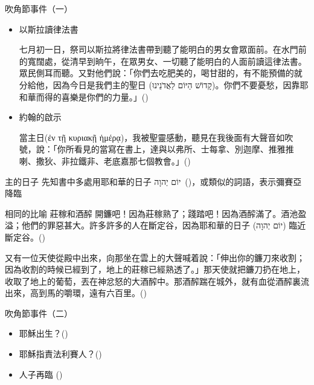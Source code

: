\documentclass{beamer}
\newcommand{\parvspace}{\par\vspace{0.5em}}
\begin{document}
\begin{frame}{吹角節事件（一）}
  \begin{itemize}
    \item 以斯拉讀律法書\par
      \alert{七月初一日}，祭司以斯拉將律法書帶到聽了能明白的男女會眾面前。在水門前的寬闊處，從清早到晌午，在眾男女、一切聽了能明白的人面前讀這律法書。眾民側耳而聽。\textellipsis{}又對他們說：「你們去吃肥美的，喝甘甜的，有不能預備的就分給他，因為今日是\alert{我們主的聖日 (\texthebrew{קָדוֹשׁ הַיּוֹם לַאֲדֹנֵינוּ})}。你們不要憂愁，因靠耶和華而得的喜樂是你們的力量。」()
    \item 約翰的啟示\par
      \alert{當主日(\textgreek{ἐν τῇ κυριακῇ ἡμέρᾳ})}，我被聖靈感動，聽見在我後面\alert{有大聲音如吹號}，說：「你所看見的當寫在書上，達與以弗所、士每拿、別迦摩、推雅推喇、撒狄、非拉鐵非、老底嘉那七個教會。」()
  \end{itemize}
\end{frame}

\begin{frame}{主的日子}
  先知書中多處用\alert{耶和華的日子 \texthebrew{יוֹם יְהוָה}}\ ()，或類似的詞語，表示\alert{彌賽亞降臨}\parvspace
\end{frame}

\begin{frame}{相同的比喻 \textemdash 莊稼和酒醡}
  \alert{開鐮}吧！因為\alert{莊稼熟了}；踐踏吧！因為\alert{酒醡滿了}。酒池盈溢；他們的\alert{罪惡甚大}。許多許多的人在斷定谷，因為耶和華的日子 (\texthebrew{יוֹם יְהוָה}) 臨近斷定谷。()\parvspace
  又有一位天使從殿中出來，向那坐在雲上的大聲喊着說：「\alert{伸出你的鐮刀來收割}；因為收割的時候已經到了，\alert{地上的莊稼已經熟透了}。」\textellipsis{}那天使就把鐮刀扔在地上，收取了地上的葡萄，丟在\alert{神忿怒的大酒醡中}。那酒醡踹在城外，就有血從酒醡裏流出來，\alert{高到馬的嚼環，遠有六百里}。()\parvspace
\end{frame}

\begin{frame}{吹角節事件（二）}
  \begin{itemize}
    \item 耶穌出生？()
    \item 耶穌指責法利賽人？()\parencite{YeshuaInYomTeruah}
    \item 人子再臨 ()
  \end{itemize}
\end{frame}
\end{document}
